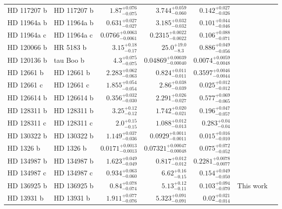 \begin{longtable*}{llrrrrr}
HD 117207 b & HD 117207 b & $1.87^{+0.076}_{-0.075}$ & $3.744^{+0.059}_{-0.060}$ & $0.142^{+0.027}_{-0.026}$ & \cite{Marcy05} & \\
HD 11964a b & HD 11964a b & $0.631^{+0.027}_{-0.027}$ & $3.185^{+0.032}_{-0.032}$ & $0.101^{+0.044}_{-0.046}$ & \cite{Butler06} & \\
HD 11964a c & HD 11964a c & $0.0766^{+0.0063}_{-0.0061}$ & $0.2315^{+0.0022}_{-0.0022}$ & $0.106^{+0.088}_{-0.071}$ & \cite{Wright09} & \\
HD 120066 b & HR 5183 b & $3.15^{+0.18}_{-0.17}$ & $25.0^{+19.0}_{-8.3}$ & $0.886^{+0.049}_{-0.056}$ & \cite{Blunt19} & \\
HD 120136 b & tau Boo b & $4.3^{+0.075}_{-0.075}$ & $0.04869^{+0.00039}_{-0.00040}$ & $0.0074^{+0.0059}_{-0.0048}$ & \cite{Butler97} & \\
HD 12661 b & HD 12661 b & $2.283^{+0.062}_{-0.063}$ & $0.824^{+0.011}_{-0.011}$ & $0.3597^{+0.0046}_{-0.0044}$ & \cite{Fischer01} & \\
HD 12661 c & HD 12661 c & $1.855^{+0.054}_{-0.054}$ & $2.86^{+0.038}_{-0.039}$ & $0.025^{+0.012}_{-0.012}$ & \cite{Fischer03} & \\
HD 126614 b & HD 126614 b & $0.356^{+0.032}_{-0.030}$ & $2.291^{+0.026}_{-0.027}$ & $0.577^{+0.069}_{-0.065}$ & \cite{Howard10} & \\
HD 128311 b & HD 128311 b & $3.25^{+0.12}_{-0.12}$ & $1.742^{+0.020}_{-0.021}$ & $0.196^{+0.047}_{-0.057}$ & \cite{Butler03} & \\
HD 128311 c & HD 128311 c & $2.0^{+0.15}_{-0.15}$ & $1.088^{+0.012}_{-0.013}$ & $0.283^{+0.04}_{-0.04}$ & \cite{Vogt05} & \\
HD 130322 b & HD 130322 b & $1.149^{+0.037}_{-0.036}$ & $0.0929^{+0.0011}_{-0.0011}$ & $0.015^{+0.016}_{-0.010}$ & \cite{Udry00} & \\
HD 1326 b & HD 1326 b & $0.0171^{+0.0013}_{-0.0013}$ & $0.07321^{+0.00047}_{-0.00048}$ & $0.075^{+0.072}_{-0.052}$ & \cite{Howard14} & \\
HD 134987 b & HD 134987 b & $1.623^{+0.049}_{-0.049}$ & $0.817^{+0.012}_{-0.012}$ & $0.2281^{+0.0078}_{-0.0077}$ & \cite{Vogt00} & \\
HD 134987 c & HD 134987 c & $0.934^{+0.063}_{-0.060}$ & $6.62^{+0.16}_{-0.15}$ & $0.154^{+0.049}_{-0.050}$ & \cite{Jones10} & \\
HD 136925 b & HD 136925 b & $0.84^{+0.078}_{-0.074}$ & $5.13^{+0.12}_{-0.11}$ & $0.103^{+0.094}_{-0.070}$ & This work & \\
HD 13931 b & HD 13931 b & $1.911^{+0.077}_{-0.076}$ & $5.323^{+0.091}_{-0.091}$ & $0.02^{+0.021}_{-0.014}$ & \cite{Howard10} & \\

\end{longtable*}
